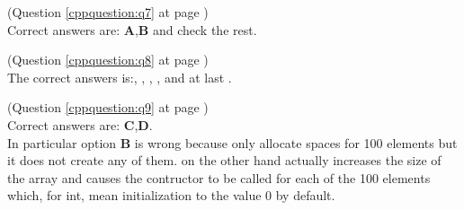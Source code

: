 \begin{cppanswer}
    \label{cppquestion:s7}
    (Question \ref{cppquestion:q7} at page \pageref{cppquestion:q7}) \hfill \\
    Correct answers are: \textbf{A},\textbf{B} and check the rest. \\       
\end{cppanswer}

\begin{cppanswer}
    \label{cppquestion:s8}
    (Question \ref{cppquestion:q8} at page \pageref{cppquestion:q8}) \hfill \\
    The correct answers is:, , , ,  and at last . \\
\end{cppanswer}


\begin{cppanswer}
    \label{cppquestion:s9}
    (Question \ref{cppquestion:q9} at page \pageref{cppquestion:q9}) \hfill \\
    Correct answers are: \textbf{C},\textbf{D}. \\
    In particular option \textbf{B} is wrong because  only allocate spaces for 100 elements but it does not create any of them.
     on the other hand actually increases the size of the array and causes the contructor to be called for each of the 100 elements which, for int, mean initialization to the value 0 by default.
\end{cppanswer}